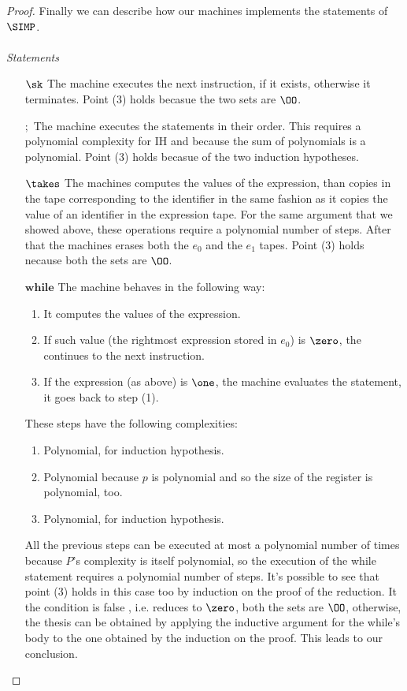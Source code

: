 \begin{proof}
Finally we can describe how our machines implements the statements of $\SIMP$.
\\\\
\emph{Statements}
\begin{itemize}
\item[$\sk$] The machine executes the next instruction, if it exists, otherwise it terminates. Point (3) holds becasue the two sets are $\OO$.
\item[$;$] The machine executes the statements in their order. This requires a polynomial complexity for IH and because the sum of polynomials is a polynomial. Point (3) holds becasue of the two induction hypotheses.
\item[$\takes $] The machines computes the values of the expression, than copies in the tape corresponding to the identifier in the same fashion as it copies the value of an identifier in the expression tape. For the same argument that we showed above, these operations require a polynomial number of steps. After that the machines erases both the $e_0$ and the $e_1$ tapes. Point (3) holds necause both the sets are $\OO$.
\item[$\mathbf{while}$] The machine behaves in the following way:
\begin{enumerate}
\item It computes the values of the expression.
\item If such value (the rightmost expression stored in $e_0$) is $\zero$, the continues to the next instruction.
\item If the expression (as above) is $\one$, the machine evaluates the statement, it goes back to step (1).
\end{enumerate}
These steps have the following complexities:
\begin{enumerate}
\item Polynomial, for induction hypothesis.
\item Polynomial because $p$ is polynomial and so the size of the register is polynomial, too.
\item Polynomial, for induction hypothesis.
\end{enumerate}
All the previous steps can be executed at most a polynomial number of times because $P$'s complexity is itself polynomial, so the execution of the while statement requires a polynomial number of steps. It's possible to see that point (3) holds in this case too by induction on the proof of the reduction. It the condition is false , i.e. reduces to \(\zero\), both the sets are $\OO$, otherwise, the thesis can be obtained by applying the inductive argument for the while's body to the one obtained by the induction on the proof. This leads to our conclusion.


\end{itemize}
\end{proof}
